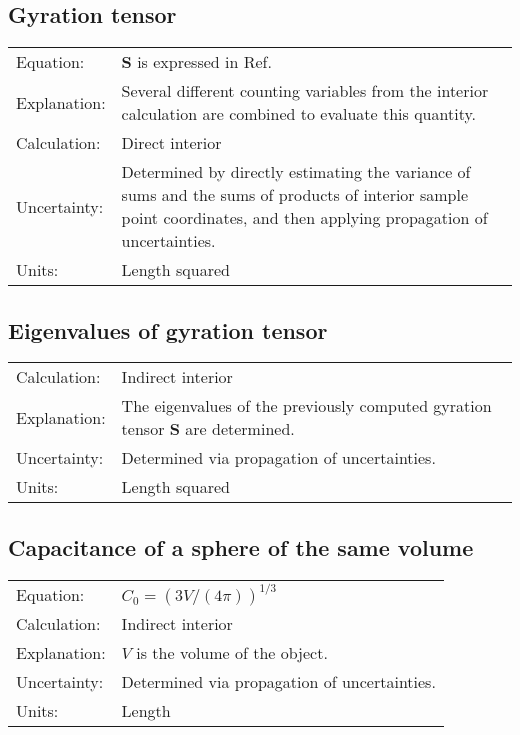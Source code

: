 \documentclass[12pt,letterpaper]{article}
\begin{document}
\subsection{Gyration tensor}
\begin{tabular}{p{1in} p{5.5in}}
Equation: & $\mathbf{S}$ is expressed in Ref.~\cite{Theodorou1985} \\
Explanation: &  Several different counting variables from the interior calculation are combined to evaluate this quantity. \\
Calculation: & Direct interior  \\
Uncertainty: & Determined by directly estimating the variance of sums and the sums of products of interior sample point coordinates, and then applying propagation of uncertainties. \\
Units: & Length squared \\
\end{tabular}

\subsection{Eigenvalues of gyration tensor}
\begin{tabular}{p{1in} p{5.5in}}
Calculation: & Indirect interior  \\
Explanation: & The eigenvalues of the previously computed gyration tensor $\mathbf{S}$ are determined. \\
Uncertainty: & Determined via propagation of uncertainties. \\
Units: & Length squared \\
\end{tabular}

\subsection{Capacitance of a sphere of the same volume}
\begin{tabular}{p{1in} p{5.5in}}
Equation: & $C_0 = \left(3V/(4\pi)\right)^{1/3}$\\
Calculation: & Indirect interior  \\
Explanation: & $V$ is the volume of the object. \\
Uncertainty: & Determined via propagation of uncertainties. \\
Units: & Length \\
\end{tabular}
\end{document}

